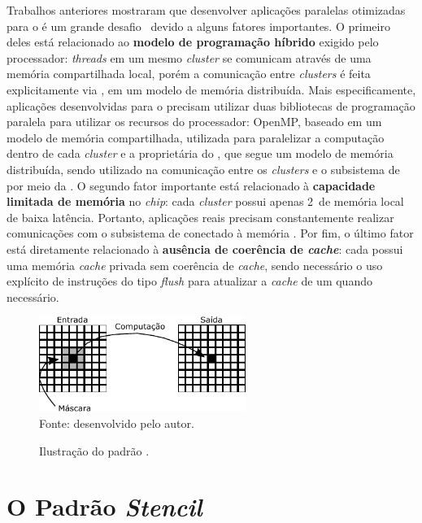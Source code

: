 Trabalhos anteriores mostraram que desenvolver aplicações paralelas otimizadas
para o \mppa é um grande desafio~\cite{Castro-IA3-JPDC:2014} devido a alguns
fatores importantes. O primeiro deles está relacionado ao \textbf{modelo de
    programação híbrido} exigido pelo processador: \textit{threads} em um mesmo
\textit{cluster} se comunicam através de uma memória compartilhada local, porém
a comunicação entre \textit{clusters} é feita explicitamente via \noc, em um
modelo de memória distribuída. Mais especificamente, aplicações desenvolvidas
para o \mppa precisam utilizar duas bibliotecas de programação paralela para
utilizar os recursos do processador: OpenMP, baseado em um modelo de memória
compartilhada, utilizada para paralelizar a computação dentro de cada
\textit{cluster} e a \api proprietária do \mppa, que segue um modelo de memória
distribuída, sendo utilizado na comunicação entre os \textit{clusters} e o
subsistema de \es por meio da \noc. O segundo fator importante está relacionado
à \textbf{capacidade limitada de memória} no \textit{chip}: cada \textit{cluster}
possui apenas 2~\mb de memória local de baixa latência. Portanto, aplicações
reais precisam constantemente realizar comunicações com o subsistema de \es
conectado à memória \lpddr. Por fim, o último fator está diretamente relacionado
à \textbf{ausência de coerência de \textit{cache}}: cada \pe possui uma memória
\textit{cache} privada sem coerência de \textit{cache}, sendo necessário o uso
explícito de instruções do tipo \textit{flush} para atualizar a \textit{cache}
de um \pe quando necessário.


\begin{figure}[t]
	\centering
	\caption{Ilustração do padrão \stencil.}
	\includegraphics[width=0.6\textwidth]{figs/stencilComp.pdf} \\
    Fonte: desenvolvido pelo autor.
	\label{fig:stencil}
\end{figure}

\section{O Padrão \textit{Stencil}}
\label{sec:stencil}

